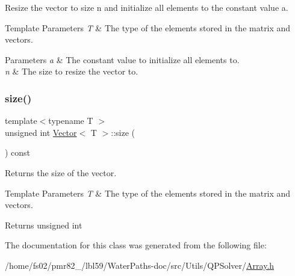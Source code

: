 Resize the vector to size {\ttfamily n} and initialize all elements to the constant value {\ttfamily a}. 


\begin{DoxyTemplParams}{Template Parameters}
{\em T} & The type of the elements stored in the matrix and vectors. \\
\hline
\end{DoxyTemplParams}

\begin{DoxyParams}{Parameters}
{\em a} & The constant value to initialize all elements to. \\
\hline
{\em n} & The size to resize the vector to. \\
\hline
\end{DoxyParams}
\mbox{\label{classVector_a5214a382564aedc712b609416aa3b7b1}} 
\subsubsection{\texorpdfstring{size()}{size()}}
{\footnotesize\ttfamily template$<$typename T $>$ \\
unsigned int \mbox{\hyperlink{classVector}{Vector}}$<$ T $>$\+::size (\begin{DoxyParamCaption}{ }\end{DoxyParamCaption}) const\hspace{0.3cm}{\ttfamily [inline]}}



Returns the size of the vector. 


\begin{DoxyTemplParams}{Template Parameters}
{\em T} & The type of the elements stored in the matrix and vectors. \\
\hline
\end{DoxyTemplParams}
\begin{DoxyReturn}{Returns}
unsigned int 
\end{DoxyReturn}


The documentation for this class was generated from the following file\+:\begin{DoxyCompactItemize}
\item 
/home/fs02/pmr82\+\_/lbl59/\+Water\+Paths-\/doc/src/\+Utils/\+Q\+P\+Solver/\mbox{\hyperlink{Array_8h}{Array.\+h}}\end{DoxyCompactItemize}
